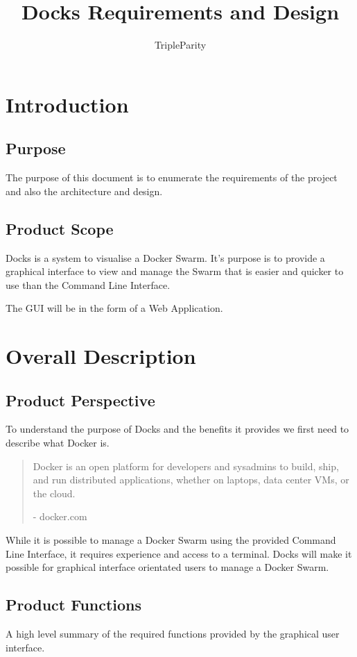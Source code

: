 \documentclass[]{article}
\title{Docks Requirements and Design}
\author{TripleParity}
\date{}
\begin{document}
\maketitle

\tableofcontents

\section{Introduction}
\subsection{Purpose}
The purpose of this document is to enumerate the requirements of the project and also the architecture and design.

\subsection{Product Scope}
Docks is a system to visualise a Docker Swarm. It's purpose is to provide a graphical interface to view and manage the Swarm that is easier and quicker to use than the Command Line Interface.

The GUI will be in the form of a Web Application.

\section{Overall Description}
\subsection{Product Perspective}
To understand the purpose of Docks and the benefits it provides we first need to describe what Docker is.

\begin{quotation}
Docker is an open platform for developers and sysadmins to build, ship, and run distributed applications, whether on laptops, data center VMs, or the cloud.

- docker.com
\end{quotation}

While it is possible to manage a Docker Swarm using the provided Command Line Interface, it requires experience and access to a terminal. Docks will make it possible for graphical interface orientated users to manage a Docker Swarm.

\subsection{Product Functions}
A high level summary of the required functions provided by the graphical user interface.
\end{document}
